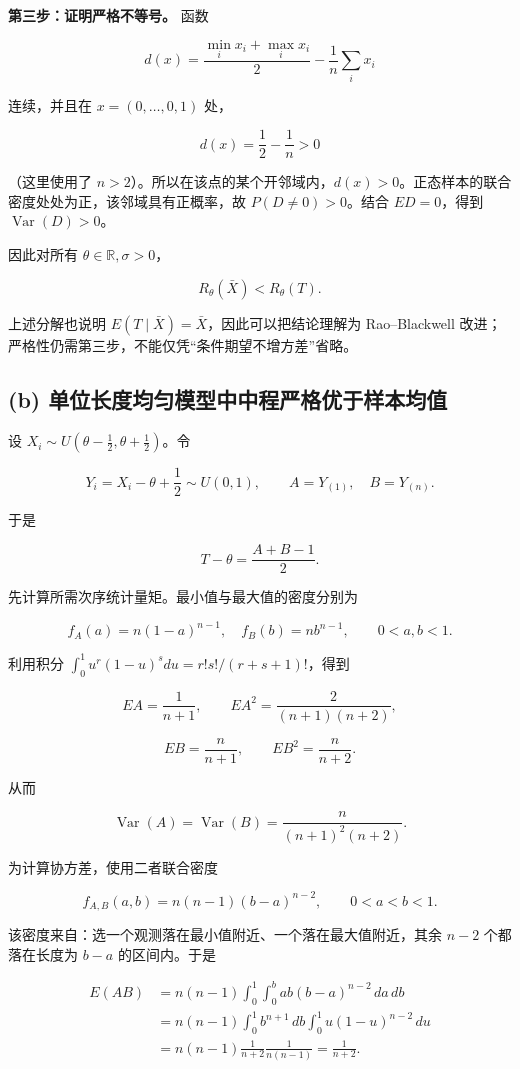 \textbf{第三步：证明严格不等号。} 函数

\[
d(x)=\frac{\min_i x_i+\max_i x_i}{2}
-\frac1n\sum_i x_i
\]

连续，并且在 $x=(0,\ldots,0,1)$ 处，

\[
d(x)=\frac12-\frac1n>0
\]

（这里使用了 $n>2$）。所以在该点的某个开邻域内，$d(x)>0$。正态样本的联合密度处处为正，该邻域具有正概率，故 $P(D\ne0)>0$。结合 $ED=0$，得到 $\operatorname{Var}(D)>0$。

因此对所有 $\theta\in\mathbb R,\sigma>0$，

\[
\boxed{R_\theta(\bar X)<R_\theta(T)}.
\]

上述分解也说明 $E(T\mid\bar X)=\bar X$，因此可以把结论理解为 Rao--Blackwell 改进；严格性仍需第三步，不能仅凭“条件期望不增方差”省略。

\subsection{(b) 单位长度均匀模型中中程严格优于样本均值}

设 $X_i\sim U(\theta-\tfrac12,\theta+\tfrac12)$。令

\[
Y_i=X_i-\theta+\frac12\sim U(0,1),\qquad
A=Y_{(1)},\quad B=Y_{(n)}.
\]

于是

\[
T-\theta=\frac{A+B-1}{2}.
\]

先计算所需次序统计量矩。最小值与最大值的密度分别为

\[
f_A(a)=n(1-a)^{n-1},\quad
f_B(b)=nb^{n-1},\qquad 0<a,b<1.
\]

利用积分 $\int_0^1u^r(1-u)^sdu=r!s!/(r+s+1)!$，得到

\[
EA=\frac1{n+1},\qquad EA^2=\frac2{(n+1)(n+2)},
\]

\[
EB=\frac n{n+1},\qquad EB^2=\frac n{n+2}.
\]

从而

\[
\operatorname{Var}(A)=\operatorname{Var}(B)
=\frac{n}{(n+1)^2(n+2)}.
\]

为计算协方差，使用二者联合密度

\[
f_{A,B}(a,b)=n(n-1)(b-a)^{n-2},
\qquad 0<a<b<1.
\]

该密度来自：选一个观测落在最小值附近、一个落在最大值附近，其余 $n-2$ 个都落在长度为 $b-a$ 的区间内。于是

\[
\begin{aligned}
E(AB)
&=n(n-1)\int_0^1\int_0^b ab(b-a)^{n-2}\,da\,db\\
&=n(n-1)\int_0^1 b^{n+1}\,db
\int_0^1u(1-u)^{n-2}\,du\\
&=n(n-1)\frac1{n+2}\frac1{n(n-1)}
=\frac1{n+2}.
\end{aligned}
\]

